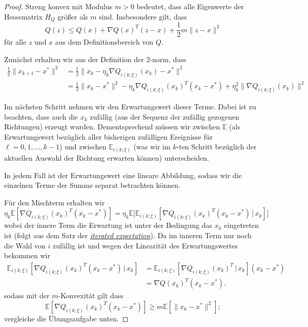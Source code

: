 \documentclass[
]{book}
\theoremstyle{definition}
\theoremstyle{definition}
\theoremstyle{definition}
\theoremstyle{definition}
\theoremstyle{remark}
\begin{document}
\begin{proof}
Streng konvex mit Modulus \(m>0\) bedeutet, dass alle Eigenwerte der Hessematrix \(H_Q\) größer als \(m\) sind.
Insbesondere gilt, dass
\begin{equation*}
Q(z) \leq Q(x) + \nabla Q(x)^T(z-x) + \frac12 m \|z-x\|^2
\end{equation*}
für alle \(z\) und \(x\) aus dem Definitionsbereich von \(Q\).

Zunächst erhalten wir aus der Definition der 2-norm, dass
\begin{equation*}
\begin{split}
\frac 12 \|x_{k+1} - x^* \|^2 &= 
\frac 12 \|x_{k} - \eta_k \nabla Q_{i(k;\xi)}(x_k) - x^* \|^2 \\
&=
\frac 12 \|x_{k} - x^* \|^2 - \eta_k \nabla Q_{i(k;\xi)}(x_k)^T( x_{k} -x^*) + \eta_k^2 \|\nabla Q_{i(k;\xi)}(x_k)\|^2
\end{split}
\end{equation*}

Im nächsten Schritt nehmen wir den Erwartungswert dieser Terme. Dabei ist zu beachten, dass auch die \(x_k\) zufällig (aus der Sequenz der zufällig gezogenen Richtungen) erzeugt wurden. Dementsprechend müssen wir zwischen \(\mathbb E\) (als Erwartungswert bezüglich aller bisherigen zufälligen Ereignisse für \(\ell=0, 1, \dotsc, k-1\)) und zwischen \(\mathbb E_{i(k;\xi)}\) (was wir im \(k\)-ten Schritt bezüglich der aktuellen Auswahl der Richtung erwarten können) unterscheiden.

In jedem Fall ist der Erwartungswert eine lineare Abbildung, sodass wir die einzelnen Terme der Summe separat betrachten können.

Für den Mischterm erhalten wir
\begin{equation*}
\eta_k \mathbb E[ \nabla Q_{i(k;\xi)}(x_k)^T( x_{k} -x^*) ] = 
\eta_k \mathbb E\bigl [\mathbb E_{i(k;\xi)}[ \nabla Q_{i(k;\xi)}(x_k)^T( x_{k} -x^*)\,|\, x_k ]\bigr ]
\end{equation*}
wobei der innere Term die Erwartung ist unter der Bedingung das \(x_k\) eingetreten ist (folgt aus dem Satz der \href{https://en.wikipedia.org/wiki/Law_of_total_expectation}{\emph{iterated expectation}}).
Da im inneren Term nur noch die Wahl von \(i\) zufällig ist und wegen der Linearität des Erwartungswertes bekommen wir
\begin{equation*}
\begin{split}
\mathbb E_{i(k;\xi)}[ \nabla Q_{i(k;\xi)}(x_k)^T( x_{k} -x^*)\,|\, x_k ] &=
\mathbb E_{i(k;\xi)}[ \nabla Q_{i(k;\xi)}(x_k)^T\,|\, x_k ]( x_{k} -x^*) \\
& = \nabla Q(x_k)^T(x_k - x^*).
\end{split}
\end{equation*}
sodass mit der \(m\)-Konvexität gilt dass
\begin{equation}
\mathbb E[ \nabla Q_{i(k;\xi)}(x_k)^T( x_{k} -x^*) ] \geq m \mathbb E[\|x_k - x^*\|^2];
\label{eq:eqn-m-konvex-grad-est}
\end{equation}
vergleiche die Übungsaufgabe unten.


\end{proof}
\end{document}
